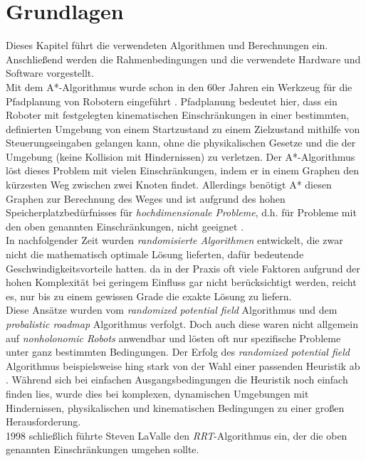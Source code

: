 \section{Grundlagen}
\label{sec:Grundlagen}
Dieses Kapitel führt die verwendeten Algorithmen und Berechnungen ein. Anschließend werden die Rahmenbedingungen und die verwendete Hardware und Software vorgestellt.\\
Mit dem A*-Algorithmus wurde schon in den 60er Jahren ein Werkzeug für die Pfadplanung von Robotern eingeführt \citep{astar68}. Pfadplanung bedeutet hier, dass ein Roboter mit festgelegten kinematischen Einschränkungen in einer bestimmten, definierten Umgebung von einem Startzustand zu einem Zielzustand mithilfe von Steuerungseingaben gelangen kann, ohne die physikalischen Gesetze und die der Umgebung (keine Kollision mit Hindernissen) zu verletzen. Der A*-Algorithmus löst dieses Problem mit vielen Einschränkungen, indem er in einem Graphen den kürzesten Weg zwischen zwei Knoten findet. Allerdings benötigt A* diesen Graphen zur Berechnung des Weges und ist aufgrund des hohen Speicherplatzbedürfnisses für \textit{hochdimensionale Probleme}, d.h. für Probleme mit den oben genannten Einschränkungen, nicht geeignet \citep{astar68}.\\
In nachfolgender Zeit wurden \textit{randomisierte Algorithmen} entwickelt, die zwar nicht die mathematisch optimale Lösung lieferten, dafür bedeutende Geschwindigkeitsvorteile hatten. da in der Praxis oft viele Faktoren aufgrund der hohen Komplexität bei geringem Einfluss gar nicht berücksichtigt werden, reicht es, nur bis zu einem gewissen Grade die exakte Lösung zu liefern. \\
Diese Ansätze wurden vom \textit{randomized potential field} Algorithmus \citep{BaLa91} und dem \textit{probalistic roadmap} Algorithmus \citep{AmWu96} verfolgt. Doch auch diese waren nicht allgemein auf \textit{nonholonomic Robots} anwendbar und lösten oft nur spezifische Probleme unter ganz bestimmten Bedingungen. Der Erfolg des \textit{randomized potential field} Algorithmus beispielsweise hing stark von der Wahl einer passenden Heuristik ab \citep[vgl. Kap 3.4 in ][]{BaLa91}. Während sich bei einfachen Ausgangsbedingungen die Heuristik noch einfach finden lies, wurde dies bei komplexen, dynamischen Umgebungen mit Hindernissen, physikalischen und kinematischen Bedingungen zu einer großen Herausforderung. \\
1998 schließlich führte Steven LaValle den \textit{RRT}-Algorithmus ein, der die oben genannten Einschränkungen umgehen sollte.


